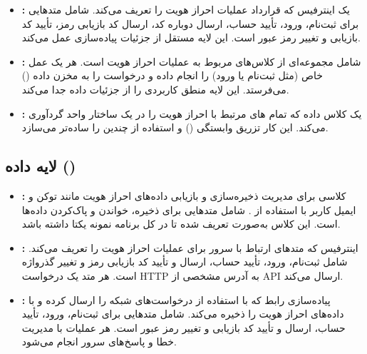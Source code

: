 \begin{itemize}
	\item \textbf{:}  
	یک اینترفیس که قرارداد عملیات احراز هویت را تعریف می‌کند. شامل متدهایی برای ثبت‌نام، ورود، تأیید حساب، ارسال دوباره کد، ارسال کد بازیابی رمز، تأیید کد بازیابی و تغییر رمز عبور است. این لایه مستقل از جزئیات پیاده‌سازی عمل می‌کند.
	
	\item \textbf{:}  
	شامل مجموعه‌ای از کلاس‌های  مربوط به عملیات احراز هویت است. هر  یک عمل خاص (مثل ثبت‌نام یا ورود) را انجام داده و درخواست را به مخزن داده () می‌فرستد. این لایه منطق کاربردی را از جزئیات داده جدا می‌کند.
	
	\item \textbf{:}  
	یک کلاس داده که تمام ‌های مرتبط با احراز هویت را در یک ساختار واحد گردآوری می‌کند. این کار تزریق وابستگی () و استفاده از چندین  را ساده‌تر می‌سازد.
	
\end{itemize}

\subsection{لایه داده ()}
\begin{itemize}
	\item \textbf{:}  
	کلاسی برای مدیریت ذخیره‌سازی و بازیابی داده‌های احراز هویت مانند توکن و ایمیل کاربر با استفاده از . شامل متدهایی برای ذخیره، خواندن و پاک‌کردن داده‌ها است. این کلاس به‌صورت  تعریف شده تا در کل برنامه نمونه یکتا داشته باشد.
	
	\item \textbf{:}  
	اینترفیس  که متدهای ارتباط با سرور برای عملیات احراز هویت را تعریف می‌کند. شامل ثبت‌نام، ورود، تأیید حساب، ارسال و تأیید کد بازیابی رمز و تغییر گذرواژه است. هر متد یک درخواست HTTP  به آدرس مشخصی از API ارسال می‌کند.
	
	\item \textbf{:}  
	پیاده‌سازی رابط  که با استفاده از  درخواست‌های شبکه را ارسال کرده و با  داده‌های احراز هویت را ذخیره می‌کند. شامل متدهایی برای ثبت‌نام، ورود، تأیید حساب، ارسال و تأیید کد بازیابی و تغییر رمز عبور است. هر عملیات با مدیریت خطا و پاسخ‌های سرور انجام می‌شود.
\end{itemize}

